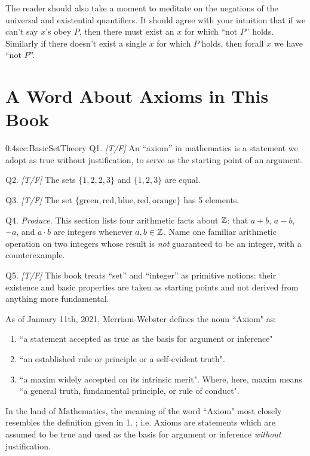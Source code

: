 \noindent The reader should also take a moment to meditate on the negations of the universal and existential quantifiers. It should agree with your intuition that if we can't say  $x$'s obey $P$, then there must exist an $x$ for which ``not $P$'' holds. Similarly if there doesn't exist a single $x$ for which $P$ holds, then forall $x$ we have ``not $P$''.
\newpage
\section{A Word About Axioms in This Book}
\label{sec:axioms}

\begin{selfcheckbox}{0.4}{sec:BasicSetTheory}
  \hypertarget{q:ch0:axioms}{}
  Q1. \textit{[T/F]} An ``axiom'' in mathematics is a statement we adopt as true without justification, to serve as the starting point of an argument.\par\smallskip
  Q2. \textit{[T/F]} The sets $\{1, 2, 2, 3\}$ and $\{1, 2, 3\}$ are equal.\par\smallskip
  Q3. \textit{[T/F]} The set $\{\text{green}, \text{red}, \text{blue}, \text{red}, \text{orange}\}$ has 5 elements.\par\smallskip
  Q4. \textit{Produce.} This section lists four arithmetic facts about ${\mathbb{Z}}$: that $a + b$, $a - b$, $-a$, and $a \cdot b$ are integers whenever $a, b \in {\mathbb{Z}}$. Name one familiar arithmetic operation on two integers whose result is \emph{not} guaranteed to be an integer, with a counterexample.\par\smallskip
  Q5. \textit{[T/F]} This book treats ``set'' and ``integer'' as primitive notions: their existence and basic properties are taken as starting points and not derived from anything more fundamental.
  \par\medskip\hfill{}
\end{selfcheckbox}

As of January 11th, 2021, Merriam-Webster defines the noun ``Axiom" as:
\begin{enumerate}
    \item ``a statement accepted as true as the basis for argument or inference"
    \item ``an established rule or principle or a self-evident truth".
    \item ``a maxim widely accepted on its intrinsic merit". Where, here, maxim means ``a general truth, fundamental principle, or rule of conduct".
\end{enumerate}
In the land of Mathematics, the meaning of the word ``Axiom" most closely resembles the definition given in 1. ; i.e. Axioms are statements which are assumed to be true and used as the basis for argument or inference \textit{without} justification. 

